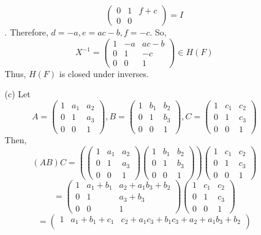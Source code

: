 \documentclass[12pt]{article}
\begin{document}
\begin{itemize}
\begin{itemize}
$$\begin{pmatrix}
0 & 1 & f + c \\
0 & 0 & 
\end{pmatrix} = I$$.
Therefore, $d = -a, e = ac - b, f = -c$. So,
$$X^{-1} = \begin{pmatrix}
1 & -a & ac - b \\
0 & 1 & -c \\
0 & 0 & 1
\end{pmatrix} \in H(F)$$
Thus, $H(F)$ is closed under inverses.
\item[(c)]
Let
$$A = \begin{pmatrix}
1 & a_1 & a_2 \\
0 & 1 & a_3 \\
0 & 0 & 1
\end{pmatrix}, B = \begin{pmatrix}
1 & b_1 & b_2 \\
0 & 1 & b_3 \\
0 & 0 & 1
\end{pmatrix}, C = \begin{pmatrix}
1 & c_1 & c_2 \\
0 & 1 & c_3 \\
0 & 0 & 1
\end{pmatrix}$$
Then,
$$(AB)C = \left( \begin{pmatrix}
1 & a_1 & a_2 \\
0 & 1 & a_3 \\
0 & 0 & 1
\end{pmatrix}\begin{pmatrix}
1 & b_1 & b_2 \\
0 & 1 & b_3 \\
0 & 0 & 1
\end{pmatrix} \right) \begin{pmatrix}
1 & c_1 & c_2 \\
0 & 1 & c_3 \\
0 & 0 & 1
\end{pmatrix}$$
$$= \begin{pmatrix}
1 & a_1 + b_1 & a_2 + a_1b_3 + b_2 \\
0 & 1 & a_3 + b_3 \\
0 & 0 & 1
\end{pmatrix}\begin{pmatrix}
1 & c_1 & c_2 \\
0 & 1 & c_3 \\
0 & 0 & 1
\end{pmatrix}$$
$$= \begin{pmatrix}
1 & a_1 + b_1 + c_1 & c_2 + a_1c_3 + b_1c_3 + a_2 + a_1b_3 + b_2 \\

\end{pmatrix}$$
\end{itemize}
\end{itemize}
\end{document}
